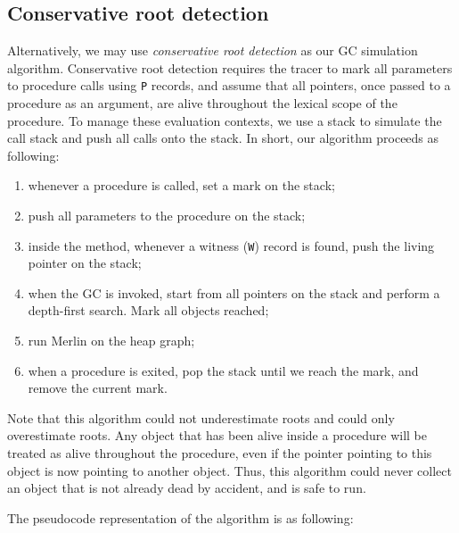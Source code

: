 \subsection{Conservative root detection}
Alternatively, we may use \emph{conservative root detection} as our GC simulation algorithm. Conservative root detection requires the tracer to mark all
parameters to procedure calls using \lstinline{P} records, and assume that all pointers, once passed to a procedure as an argument, are alive throughout
the lexical scope of the procedure. To manage these evaluation contexts, we use a stack to simulate the call stack and push all calls onto the stack. In
short, our algorithm proceeds as following:

\begin{enumerate}
\item whenever a procedure is called, set a mark on the stack;
\item push all parameters to the procedure on the stack;
\item inside the method, whenever a witness (\lstinline{W}) record is found, push the living pointer on the stack;
\item when the GC is invoked, start from all pointers on the stack and perform a depth-first search. Mark all objects reached;
\item run Merlin on the heap graph;
\item when a procedure is exited, pop the stack until we reach the mark, and remove the current mark.
\end{enumerate}

Note that this algorithm could not underestimate roots and could only overestimate roots. Any object that has been alive inside a procedure will be treated
as alive throughout the procedure, even if the pointer pointing to this object is now pointing to another object. Thus, this algorithm could never collect an
object that is not already dead by accident, and is safe to run.

The pseudocode representation of the algorithm is as following:


